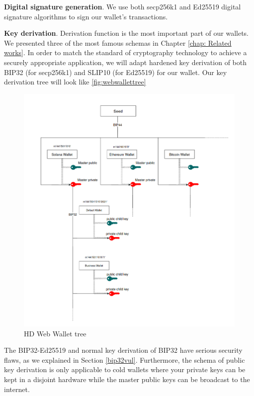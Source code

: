 \bigskip
{\textbf{Digital signature generation}}. We use both secp256k1 and Ed25519 digital signature algorithms to sign our wallet’s transactions.

\bigskip
{\textbf{Key derivation}}. Derivation function is the most important part of our wallets. We presented three of the most famous schemas in Chapter \ref{chap: Related works}. In order to match the standard of cryptography technology to achieve a securely appropriate application, we will adapt hardened key derivation of both BIP32 (for secp256k1) and SLIP10 (for Ed25519) for our wallet.
Our key derivation tree will look like \autoref{fig:webwallettree}

\begin{figure}[!ht]
    \centering
    \includegraphics[width=1\textwidth]{images/tree_web_wallet.png}
    \caption[HD Web Wallet tree]{HD Web Wallet tree}
    \label{fig:webwallettree}
\end{figure}

The BIP32-Ed25519 and normal key derivation of BIP32 have serious security flaws, as we explained in Section \ref{bip32vul}. Furthermore, the schema of public key derivation is only applicable to cold wallets where your private keys can be kept in a disjoint hardware while the master public keys can be broadcast to the internet.


